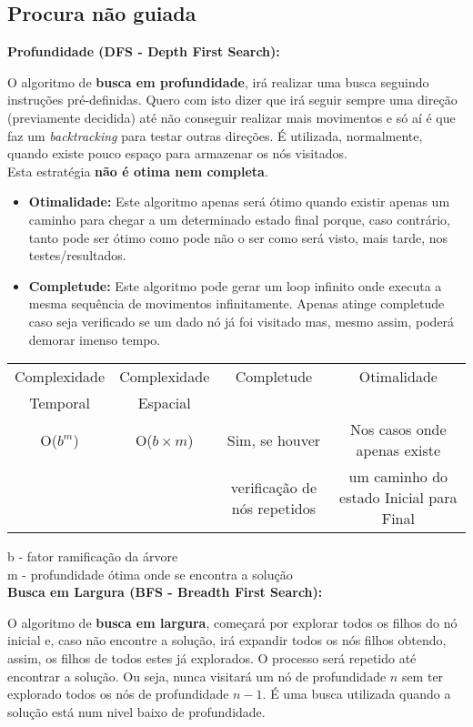 \documentclass{article}
\begin{document}
\subsection{Procura não guiada}
\textbf{Profundidade (DFS - Depth First Search):}\par
O algoritmo de \textbf{busca em profundidade}, irá realizar uma busca seguindo instruções pré-definidas. Quero com isto dizer que irá seguir sempre uma direção (previamente decidida) até não conseguir realizar mais movimentos e só aí é que faz um \textit{backtracking} para testar outras direções. É utilizada, normalmente, quando existe pouco espaço para armazenar os nós visitados.\\
Esta estratégia \textbf{não é otima nem completa}.
\begin{itemize}
\item{\textbf{Otimalidade:} Este algoritmo apenas será ótimo quando existir apenas um caminho para chegar a um determinado estado final porque, caso contrário, tanto pode ser ótimo como pode não o ser como será visto, mais tarde, nos testes/resultados.}
\item{\textbf{Completude:} Este algoritmo pode gerar um loop infinito onde executa a mesma sequência de movimentos infinitamente. Apenas atinge completude caso seja verificado se um dado nó já foi visitado mas, mesmo assim, poderá demorar imenso tempo.}
\end{itemize}
\begin{center}
\begin{tabular}{|c|c|c|c|}
  \hline
  Complexidade & Complexidade & Completude & Otimalidade\\
  Temporal & Espacial & & \\
  \hline
  O($b^m$) & O($b\times m$) & Sim, se houver & Nos casos onde apenas existe  \\
           &                & verificação de nós repetidos & um caminho do estado Inicial para Final \\
  \hline
\end{tabular}
\end{center}
b - fator ramificação da árvore\\
m - profundidade ótima onde se encontra a solução\\[5mm]
\textbf{Busca em Largura (BFS - Breadth First Search):}\par
O algoritmo de \textbf{busca em largura}, começará por explorar todos os filhos do nó inicial e, caso não encontre a solução, irá expandir todos os nós filhos obtendo, assim, os filhos de todos estes já explorados. O processo será repetido até encontrar a solução. Ou seja, nunca visitará um nó de profundidade $n$ sem ter explorado todos os nós de profundidade $n-1$. É uma busca utilizada quando a solução está num nivel baixo de profundidade.\\
\end{document}
